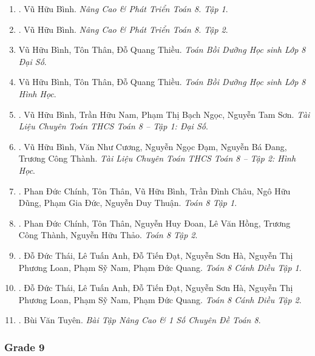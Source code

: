 \documentclass{article}
\begin{document}
\begin{enumerate}
	\item \cite{Binh_Toan_8_tap_1}. Vũ Hữu Bình. \textit{Nâng Cao \& Phát Triển Toán 8. Tập 1}.\hfill{}
	\item \cite{Binh_Toan_8_tap_2}. Vũ Hữu Bình. \textit{Nâng Cao \& Phát Triển Toán 8. Tập 2}.\hfill{}
	\item Vũ Hữu Bình, Tôn Thân, Đỗ Quang Thiều. \textit{Toán Bồi Dưỡng Học sinh Lớp 8 Đại Số}.
	\item Vũ Hữu Bình, Tôn Thân, Đỗ Quang Thiều. \textit{Toán Bồi Dưỡng Học sinh Lớp 8 Hình Học}.
	\item \cite{TLCT_THCS_Toan_8_dai_so}. Vũ Hữu Bình, Trần Hữu Nam, Phạm Thị Bạch Ngọc, Nguyễn Tam Sơn. \textit{Tài Liệu Chuyên Toán THCS Toán 8 -- Tập 1: Đại Số}.\hfill{}
	\item \cite{TLCT_THCS_Toan_8_hinh_hoc}. Vũ Hữu Bình, Văn Như Cương, Nguyễn Ngọc Đạm, Nguyễn Bá Đang, Trương Công Thành. \textit{Tài Liệu Chuyên Toán THCS Toán 8 -- Tập 2: Hình Học}.\hfill{}
	\item \cite{SGK_Toan_8_tap_1}. Phan Đức Chính, Tôn Thân, Vũ Hữu Bình, Trần Đình Châu, Ngô Hữu Dũng, Phạm Gia Đức, Nguyễn Duy
	Thuận. \textit{Toán 8 Tập 1}.\hfill{}
	\item \cite{SGK_Toan_8_tap_2}. Phan Đức Chính, Tôn Thân, Nguyễn Huy Đoan, Lê Văn Hồng, Trương Công Thành, Nguyễn Hữu Thảo. \textit{Toán 8 Tập 2}.\hfill{}
	\item \cite{SGK_Toan_8_Canh_Dieu_tap_1}. Đỗ Đức Thái, Lê Tuấn Anh, Đỗ Tiến Đạt, Nguyễn Sơn Hà, Nguyễn Thị Phương Loan, Phạm Sỹ Nam, Phạm Đức Quang. \textit{Toán 8 Cánh Diều Tập 1}.\hfill{}
	\item \cite{SGK_Toan_8_Canh_Dieu_tap_2}. Đỗ Đức Thái, Lê Tuấn Anh, Đỗ Tiến Đạt, Nguyễn Sơn Hà, Nguyễn Thị Phương Loan, Phạm Sỹ Nam, Phạm Đức Quang. \textit{Toán 8 Cánh Diều Tập 2}.\hfill{}
	\item \cite{Tuyen_Toan_8}. Bùi Văn Tuyên. \textit{Bài Tập Nâng Cao \& 1 Số Chuyên Đề Toán 8}.\hfill{}
\end{enumerate}
	
\subsubsection{Grade 9}
\end{document}
